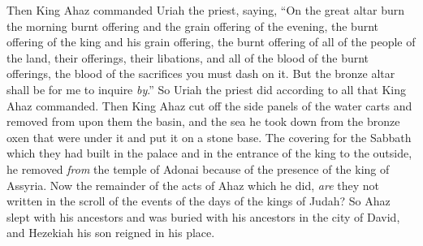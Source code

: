 \begin{biblechapter}
\verse Then King Ahaz commanded Uriah the priest, saying, “On the great altar burn the morning burnt offering and the grain offering of the evening, the burnt offering of the king and his grain offering, the burnt offering of all of the people of the land, their offerings, their libations, and all of the blood of the burnt offerings, the blood of the sacrifices you must dash on it. But the bronze altar shall be for me to inquire \textit{by}.”
\verse So Uriah the priest did according to all that King Ahaz commanded.
\verse Then King Ahaz cut off the side panels of the water carts and removed from upon them the basin, and the sea he took down from the bronze oxen that were under it and put it on a stone base.
\verse The covering for the Sabbath which they had built in the palace and in the entrance of the king to the outside, he removed \textit{from} the temple of Adonai because of the presence of the king of Assyria.
\verse Now the remainder of the acts of Ahaz which he did, \textit{are} they not written in the scroll of the events of the days of the kings of Judah?
\verse So Ahaz slept with his ancestors and was buried with his ancestors in the city of David, and Hezekiah his son reigned in his place.
\end{biblechapter}

